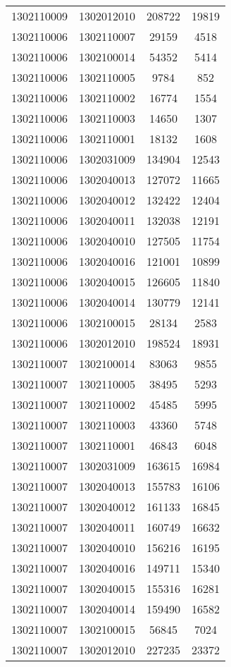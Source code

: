 \begin{longtable}{llcc}
1302110009 & 1302012010 & 208722 & 19819\\
1302110006 & 1302110007 & 29159 & 4518\\
1302110006 & 1302100014 & 54352 & 5414\\
1302110006 & 1302110005 & 9784 & 852\\
1302110006 & 1302110002 & 16774 & 1554\\
1302110006 & 1302110003 & 14650 & 1307\\
1302110006 & 1302110001 & 18132 & 1608\\
1302110006 & 1302031009 & 134904 & 12543\\
1302110006 & 1302040013 & 127072 & 11665\\
1302110006 & 1302040012 & 132422 & 12404\\
1302110006 & 1302040011 & 132038 & 12191\\
1302110006 & 1302040010 & 127505 & 11754\\
1302110006 & 1302040016 & 121001 & 10899\\
1302110006 & 1302040015 & 126605 & 11840\\
1302110006 & 1302040014 & 130779 & 12141\\
1302110006 & 1302100015 & 28134 & 2583\\
1302110006 & 1302012010 & 198524 & 18931\\
1302110007 & 1302100014 & 83063 & 9855\\
1302110007 & 1302110005 & 38495 & 5293\\
1302110007 & 1302110002 & 45485 & 5995\\
1302110007 & 1302110003 & 43360 & 5748\\
1302110007 & 1302110001 & 46843 & 6048\\
1302110007 & 1302031009 & 163615 & 16984\\
1302110007 & 1302040013 & 155783 & 16106\\
1302110007 & 1302040012 & 161133 & 16845\\
1302110007 & 1302040011 & 160749 & 16632\\
1302110007 & 1302040010 & 156216 & 16195\\
1302110007 & 1302040016 & 149711 & 15340\\
1302110007 & 1302040015 & 155316 & 16281\\
1302110007 & 1302040014 & 159490 & 16582\\
1302110007 & 1302100015 & 56845 & 7024\\
1302110007 & 1302012010 & 227235 & 23372\\

\end{longtable}
